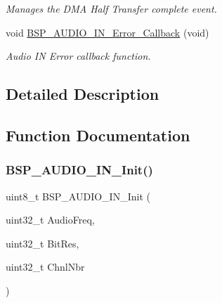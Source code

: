 \begin{DoxyCompactItemize}
\begin{DoxyCompactList}\small\item\em Manages the D\+MA Half Transfer complete event. \end{DoxyCompactList}\item 
\mbox{\label{group___s_t_m32_f4___d_i_s_c_o_v_e_r_y___a_u_d_i_o___i_n___exported___functions_ga8a997e14f50669df1d168baebfe3d83c}} 
void \mbox{\hyperlink{group___s_t_m32_f4___d_i_s_c_o_v_e_r_y___a_u_d_i_o___i_n___exported___functions_ga8a997e14f50669df1d168baebfe3d83c}{B\+S\+P\+\_\+\+A\+U\+D\+I\+O\+\_\+\+I\+N\+\_\+\+Error\+\_\+\+Callback}} (void)
\begin{DoxyCompactList}\small\item\em Audio IN Error callback function. \end{DoxyCompactList}\end{DoxyCompactItemize}


\subsection{Detailed Description}


\subsection{Function Documentation}
\mbox{\label{group___s_t_m32_f4___d_i_s_c_o_v_e_r_y___a_u_d_i_o___i_n___exported___functions_ga5a40f0d40f80fd71fd16fbb4e7fb3b7d}} 
\subsubsection{\texorpdfstring{B\+S\+P\+\_\+\+A\+U\+D\+I\+O\+\_\+\+I\+N\+\_\+\+Init()}{BSP\_AUDIO\_IN\_Init()}}
{\footnotesize\ttfamily uint8\+\_\+t B\+S\+P\+\_\+\+A\+U\+D\+I\+O\+\_\+\+I\+N\+\_\+\+Init (\begin{DoxyParamCaption}\item[{uint32\+\_\+t}]{Audio\+Freq,  }\item[{uint32\+\_\+t}]{Bit\+Res,  }\item[{uint32\+\_\+t}]{Chnl\+Nbr }\end{DoxyParamCaption})}



